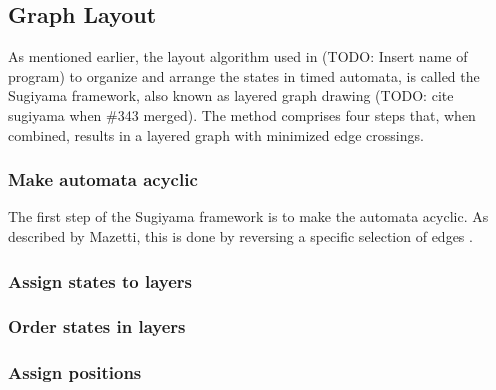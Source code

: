 \subsection{Graph Layout}


As mentioned earlier, the layout algorithm used in (TODO: Insert name of program) to organize and arrange the states in timed automata, is called the Sugiyama framework, also known as layered graph drawing (TODO: cite sugiyama when \#343 merged). The method comprises four steps that, when combined, results in a layered graph with minimized edge crossings.


\subsubsection{Make automata acyclic}
The first step of the Sugiyama framework is to make the automata acyclic. As described by Mazetti, this is done by reversing a specific selection of edges \cite{Mazetti2012}.

\subsubsection{Assign states to layers}
\subsubsection{Order states in layers}
\subsubsection{Assign positions}
